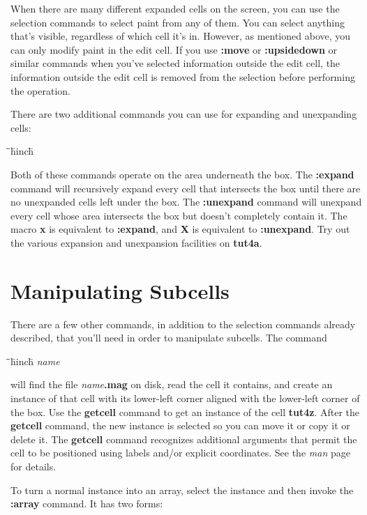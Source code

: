 \documentclass[letterpaper,twoside,12pt]{article}
\def\hinch{\hspace*{0.5in}}
\def\starti{\begin{center}\begin{tabbing}\hinch\=\hinch\=\hinch\=hinch\hinch\=\kill}
\def\endi{\end{tabbing}\end{center}}
\def\ii{\>\>\>}
\begin{document}
When there are many different expanded cells on the screen,
you can use the selection commands to select paint from any
of them.  You can select anything that's visible, regardless of
which cell it's in.  However, as mentioned above, you can only
modify paint in the edit cell.  If you use {\bfseries :move} or
{\bfseries :upsidedown} or similar commands when you've selected
information outside the edit cell, the information outside
the edit cell is removed from the selection before performing
the operation.

There are two additional commands you can use for expanding and
unexpanding cells:

\starti
   \ii {\bfseries :expand} \\
   \ii {\bfseries :unexpand}
\endi

Both of these commands operate on the area underneath the box.
The {\bfseries :expand} command will recursively
expand every cell that intersects the box until there are no
unexpanded cells left under the box.  The {\bfseries :unexpand}
command will unexpand every cell whose area intersects the box
but doesn't completely contain it.  The macro {\bfseries x} is
equivalent to {\bfseries :expand}, and {\bfseries X} is
equivalent to {\bfseries :unexpand}.  Try out the various expansion
and unexpansion facilities on {\bfseries tut4a}.

\section{Manipulating Subcells}

There are a few other commands, in addition to the selection
commands already described, that you'll need in order to
manipulate subcells.  The command

\starti
   \ii {\bfseries :getcell} {\itshape  name}
\endi

will find the file {\itshape name}{\bfseries .mag} on disk, read the cell
it contains, and create an instance of that cell with
its lower-left corner aligned with
the lower-left corner of the box.
Use the {\bfseries getcell}
command to get an instance of the cell {\bfseries tut4z}.
After the {\bfseries getcell} command, the new instance is selected
so you can move it or copy it or delete it.  The {\bfseries getcell} command
recognizes additional arguments that permit the cell to be positioned
using labels and/or explicit coordinates.  See
the {\itshape man} page for details.

To turn a normal instance into an array, select the
instance and then invoke the {\bfseries :array}
command.  It has two forms:
\end{document}
